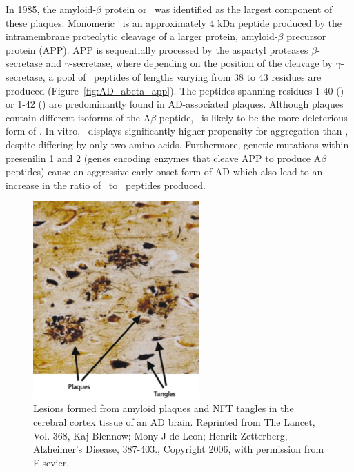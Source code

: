 In 1985, the amyloid-$\beta$ protein or \abeta\ was identified as the largest component of these plaques.\cite{Masters:1985wb}
Monomeric \abeta\ is an approximately 4 kDa peptide produced by the intramembrane proteolytic cleavage of a larger protein, amyloid-$\beta$ precursor protein (APP).\cite{Hardy:2002dh}
APP is sequentially processed by the aspartyl proteases $\beta$-secretase and $\gamma$-secretase, where depending on the position of the cleavage by $\gamma$-secretase, a pool of \abeta\ peptides of lengths varying from 38 to 43 residues are produced (Figure~\ref{fig:AD_abeta_app}).\cite{Gandy:2005dd} The peptides spanning residues 1-40 (\abetaforty) or 1-42 (\abetafortytwo) are predominantly found in AD-associated plaques.\cite{Golde:2000vg,Holtzman:2011gi} Although plaques contain different isoforms of the A$\beta$ peptide, \abetafortytwo\ is likely to be the more deleterious form of \abeta. In vitro, \abetafortytwo\ displays significantly higher propensity for aggregation than \abetaforty, despite differing by only two amino acids.\cite{Barrow:1992vz,Jarrett:1993ti,ElAgnaf:2000vr} Furthermore,  genetic mutations within presenilin 1 and 2 (genes encoding enzymes that cleave APP to produce A$\beta$ peptides) cause an aggressive early-onset form of AD which also lead to an increase in the ratio of \abetafortytwo\ to \abetaforty\ peptides produced.\cite{Hardy:1997tu,KumarSingh:2006kc,Bentahir:2006ih}

\begin{figure}
 \centering
 \includegraphics[width=2.5in]{figures/introduction/AD_tissue_pathology.pdf}
 \caption[AD tissue pathology]{Lesions formed from amyloid plaques and NFT tangles in the cerebral cortex tissue of an AD brain. Reprinted from The Lancet, Vol. 368, Kaj Blennow; Mony J de Leon; Henrik Zetterberg, Alzheimer's Disease, 387-403., Copyright 2006, with permission from Elsevier.}
 \label{fig:AD_tissue_pathology}
\end{figure}

